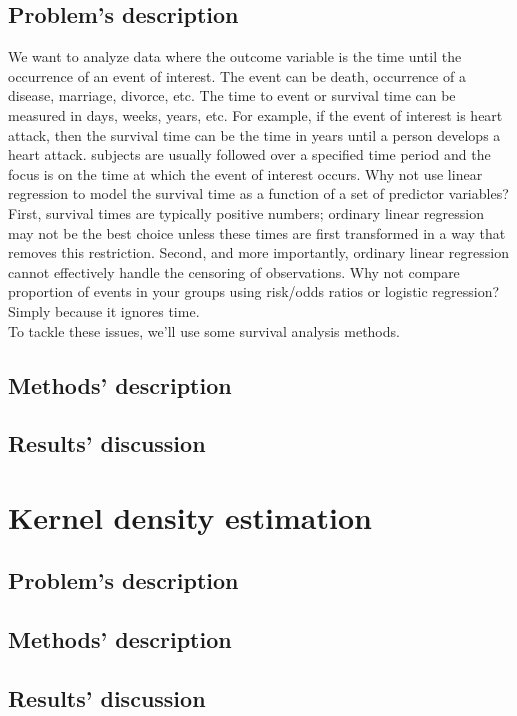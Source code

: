 \documentclass{report}
\begin{document}
\section{Problem's description}
We want to analyze data where the outcome variable is the time until the occurrence of an event of interest. The event can be death, occurrence of a disease, marriage, divorce, etc. The time to event or survival time can be measured in days, weeks, years, etc. For example, if the event of interest is heart attack, then the survival time can be the time in years until a person develops a heart attack. subjects are usually followed over a specified time period and the focus is on the time at which the event of interest occurs. Why not use linear regression to model the survival time as a function of a set of predictor variables? First, survival times are typically positive numbers; ordinary linear regression may not be the best choice unless these times are first transformed in a way that
removes this restriction. Second, and more importantly, ordinary linear regression cannot effectively handle the censoring of observations. Why not compare proportion of events in your groups using risk/odds ratios or logistic regression? Simply because it ignores time. \\
To tackle these issues, we'll use some survival analysis methods.
\section{Methods' description}

\section{Results' discussion}


\chapter{Kernel density estimation}
\section{Problem's description}

\section{Methods' description}

\section{Results' discussion}
\end{document}
